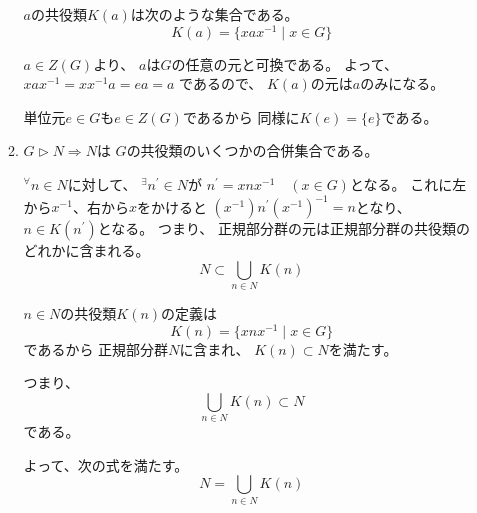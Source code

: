 \documentclass[12pt,b5paper]{ltjsarticle}
\begin{document}
\begin{enumerate}
\begin{enumerate}
             $a$の共役類$K(a)$は次のような集合である。
             \begin{equation}
              K(a) = \{xax^{-1} \mid x\in G \}
             \end{equation}

             $a\in Z(G)$より、
             $a$は$G$の任意の元と可換である。
             よって、$xax^{-1} = xx^{-1}a=ea=a$
             であるので、
             $K(a)$の元は$a$のみになる。

             単位元$e\in G$も$e\in Z(G)$であるから
             同様に$K(e)=\{e\}$である。

             \hrulefill

       \item $G \triangleright N \Rightarrow N$は
             $G$の共役類のいくつかの合併集合である。

             \dotfill

             ${}^{\forall} n\in N$に対して、
             ${}^{\exists}n^{\prime}\in N$が
             $n^{\prime} = xnx^{-1} \quad (x\in G)$となる。
             これに左から$x^{-1}$、右から$x$をかけると
             $(x^{-1})n^{\prime}(x^{-1})^{-1} = n$となり、
             $n \in K(n^{\prime})$となる。
             つまり、
             正規部分群の元は正規部分群の共役類のどれかに含まれる。
             \begin{equation}
              N \subset \bigcup_{n\in N} K(n)
             \end{equation}

             $n\in N$の共役類$K(n)$の定義は
             \begin{equation}
              K(n) = \{xnx^{-1} \mid x\in G \}
             \end{equation}
             であるから
             正規部分群$N$に含まれ、
             $K(n) \subset N$を満たす。

             つまり、
             \begin{equation}
              \bigcup_{n\in N} K(n) \subset N
             \end{equation}
             である。

             よって、次の式を満たす。
             \begin{equation}
              N= \bigcup_{n\in N} K(n)
             \end{equation}

             \hrulefill


\end{enumerate}
\end{enumerate}
\end{document}
